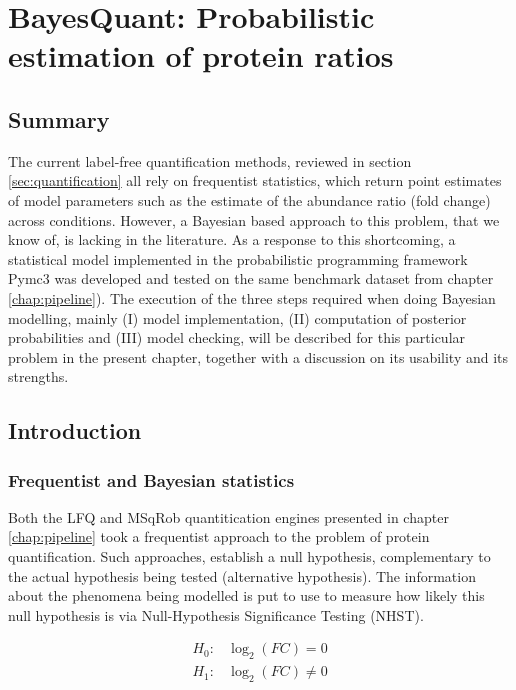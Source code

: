 \chapter{BayesQuant: Probabilistic estimation of protein ratios}
\label{chap:model}

\section*{Summary}

The current label-free quantification methods, reviewed in section \ref{sec:quantification} all rely on frequentist statistics, which return point estimates of model parameters such as the estimate of the abundance ratio (fold change) across conditions. However, a Bayesian based approach to this problem, that we know of, is lacking in the literature. As a response to this shortcoming, a statistical model implemented in the probabilistic programming framework Pymc3 was developed and tested on the same benchmark dataset from chapter \ref{chap:pipeline}). The execution of the three steps required when doing Bayesian modelling, mainly (I) model implementation, (II) computation of posterior probabilities and (III) model checking, will be described for this particular problem in the present chapter, together with a discussion on its usability and its strengths.

\section{Introduction}

\subsection{Frequentist and Bayesian statistics}

Both the LFQ and MSqRob quantitication engines presented in chapter \ref{chap:pipeline} took a frequentist approach to the problem of protein quantification. Such approaches, establish a null hypothesis, complementary to the actual hypothesis being tested (alternative hypothesis). The information about the phenomena being modelled is put to use to measure how likely this null hypothesis is via Null-Hypothesis Significance Testing (\ac{NHST}).


\begin{align}
H_0: & \log_2(FC) = 0 \nonumber \\
H_1: & \log_2(FC) \neq 0 \nonumber
\end{align}

